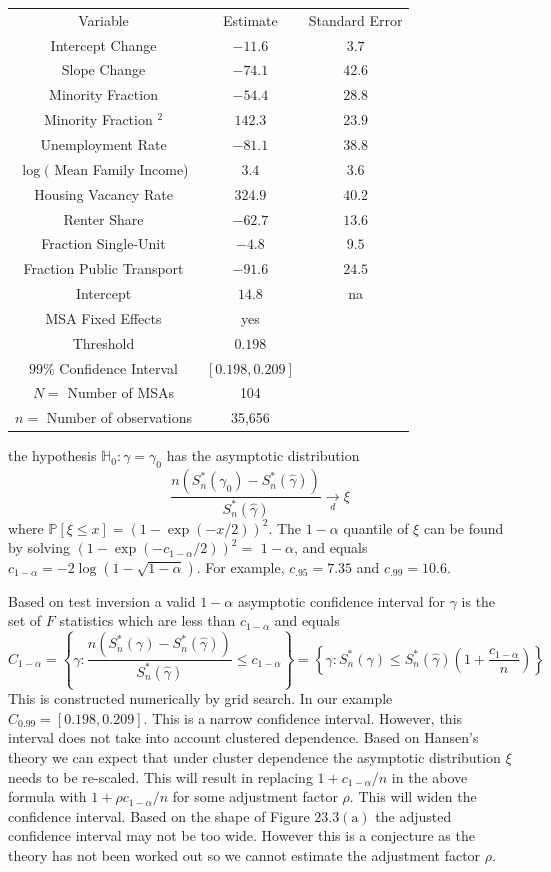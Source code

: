\documentclass[10pt]{article}
\begin{document}
\begin{tabular}{ccc}
\hline\hline
Variable & Estimate & Standard Error \\
Intercept Change & $-11.6$ & $3.7$ \\
Slope Change & $-74.1$ & $42.6$ \\
Minority Fraction & $-54.4$ & $28.8$ \\
Minority Fraction ${ }^{2}$ & $142.3$ & $23.9$ \\
Unemployment Rate & $-81.1$ & $38.8$ \\
$\log ($ Mean Family Income) & $3.4$ & $3.6$ \\
Housing Vacancy Rate & $324.9$ & $40.2$ \\
Renter Share & $-62.7$ & $13.6$ \\
Fraction Single-Unit & $-4.8$ & $9.5$ \\
Fraction Public Transport & $-91.6$ & $24.5$ \\
Intercept & $14.8$ & na \\
MSA Fixed Effects & yes &  \\
Threshold & $0.198$ &  \\
$99 \%$ Confidence Interval & $[0.198,0.209]$ &  \\
$N=$ Number of MSAs & 104 &  \\
$n=$ Number of observations & 35,656 &  \\
\hline
\end{tabular}

the hypothesis $\mathbb{H}_{0}: \gamma=\gamma_{0}$ has the asymptotic distribution
$$
\frac{n\left(S_{n}^{*}\left(\gamma_{0}\right)-S_{n}^{*}(\widehat{\gamma})\right)}{S_{n}^{*}(\widehat{\gamma})} \underset{d}{\longrightarrow} \xi
$$
where $\mathbb{P}[\xi \leq x]=(1-\exp (-x / 2))^{2}$. The $1-\alpha$ quantile of $\xi$ can be found by solving $\left(1-\exp \left(-c_{1-\alpha} / 2\right)\right)^{2}=$ $1-\alpha$, and equals $c_{1-\alpha}=-2 \log (1-\sqrt{1-\alpha})$. For example, $c_{.95}=7.35$ and $c_{.99}=10.6$.

Based on test inversion a valid $1-\alpha$ asymptotic confidence interval for $\gamma$ is the set of $F$ statistics which are less than $c_{1-\alpha}$ and equals
$$
C_{1-\alpha}=\left\{\gamma: \frac{n\left(S_{n}^{*}(\gamma)-S_{n}^{*}(\widehat{\gamma})\right)}{S_{n}^{*}(\widehat{\gamma})} \leq c_{1-\alpha}\right\}=\left\{\gamma: S_{n}^{*}(\gamma) \leq S_{n}^{*}(\widehat{\gamma})\left(1+\frac{c_{1-\alpha}}{n}\right)\right\}
$$
This is constructed numerically by grid search. In our example $C_{0.99}=[0.198,0.209]$. This is a narrow confidence interval. However, this interval does not take into account clustered dependence. Based on Hansen's theory we can expect that under cluster dependence the asymptotic distribution $\xi$ needs to be re-scaled. This will result in replacing $1+c_{1-\alpha} / n$ in the above formula with $1+\rho c_{1-\alpha} / n$ for some adjustment factor $\rho$. This will widen the confidence interval. Based on the shape of Figure $23.3(\mathrm{a})$ the adjusted confidence interval may not be too wide. However this is a conjecture as the theory has not been worked out so we cannot estimate the adjustment factor $\rho$.
\end{document}
